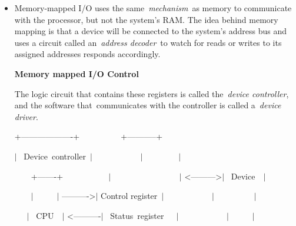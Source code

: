 \documentclass[12pt]{article}
\begin{document}
\begin{itemize}
	\item Memory-mapped I/O uses the same \textit{mechanism} as memory to communicate with the processor, but not the system's RAM. The idea behind memory mapping is that a device will be connected to the system's address bus and uses a circuit called an \textit{address decoder} to watch for reads or writes to its assigned addresses responds accordingly.\par

\setlength{\parskip}{5.04pt}
{\fontsize{13pt}{15.6pt}\selectfont \textbf{Memory mapped I/O Control}\par}\par


\vspace{\baselineskip}
{\fontsize{13pt}{15.6pt}\selectfont The logic circuit that contains these registers is called the \textit{device controller}, and the software that communicates with the controller is called a \textit{device driver}.\par}\par

\setlength{\parskip}{0.0pt}
 \tabto{0.64in}  \tabto{1.27in}  \tabto{1.91in} {\fontsize{10pt}{12.0pt}\selectfont  \tabto{2.54in} +-------------------+\ \ \ \ \ \ \ \ \ \  +-----------+\par}\par

 \tabto{0.64in}  \tabto{1.27in}  \tabto{1.91in} {\fontsize{10pt}{12.0pt}\selectfont  \tabto{2.54in} $ \vert $ \ Device\ controller\ $ \vert $ \ \ \ \ \ \ \ \ \ \ \ $ \vert $ \ \ \ \ \ \ \ \    $ \vert $    \par}\par

{\fontsize{10pt}{12.0pt}\selectfont  \tabto{0.64in} \ \ \ \ +-------+\ \ \ \ \ \ \ \ \ \ \ $ \vert $ \ \ \ \ \ \ \ \ \ \ \ \ \ \ \ \    $ \vert $ <--------->$ \vert $ \  Device\ \  $ \vert $ \par}\par

{\fontsize{10pt}{12.0pt}\selectfont  \tabto{0.64in} \ \ \ \ $ \vert $ \ \ \ \ \   $ \vert $ ---------->$ \vert $  Control register\  $ \vert $ \ \ \ \ \ \ \ \ \ \ \ $ \vert $ \ \ \ \ \ \ \ \ \   $ \vert $ \par}\par

{\fontsize{10pt}{12.0pt}\selectfont  \tabto{0.64in} \ \ \  $ \vert $ \  CPU\ \ $ \vert $ <----------$ \vert $ \ Status\ register\ \ \ $ \vert $ \ \ \ \ \ \ \ \ \ \ \ $ \vert $ \ \ \ \ \       $ \vert $ \par}\par


\end{itemize}
\end{document}
